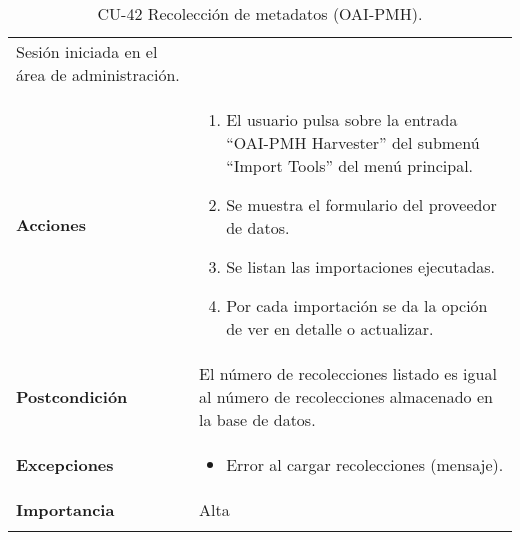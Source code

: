 \begin{longtable}[]{@{}ll@{}}
\begin{minipage}[t]{0.75\columnwidth}
Sesión iniciada en el área de administración.\strut
\end{minipage}\tabularnewline
\begin{minipage}[t]{0.19\columnwidth}\raggedright
\textbf{Acciones}\strut
\end{minipage} & \begin{minipage}[t]{0.75\columnwidth}\raggedright
\begin{enumerate}
\def\labelenumi{\arabic{enumi}.}
\tightlist
\item
  El usuario pulsa sobre la entrada ``OAI-PMH Harvester'' del submenú
  ``Import Tools'' del menú principal.
\item
  Se muestra el formulario del proveedor de datos.
\item
  Se listan las importaciones ejecutadas.
\item
  Por cada importación se da la opción de ver en detalle o actualizar.
\end{enumerate}\strut
\end{minipage}\tabularnewline
\begin{minipage}[t]{0.19\columnwidth}\raggedright
\textbf{Postcondición}\strut
\end{minipage} & \begin{minipage}[t]{0.75\columnwidth}\raggedright
El número de recolecciones listado es igual al número de recolecciones
almacenado en la base de datos.\strut
\end{minipage}\tabularnewline
\begin{minipage}[t]{0.19\columnwidth}\raggedright
\textbf{Excepciones}\strut
\end{minipage} & \begin{minipage}[t]{0.75\columnwidth}\raggedright
\begin{itemize}
\tightlist
\item
  Error al cargar recolecciones (mensaje).
\end{itemize}\strut
\end{minipage}\tabularnewline
\begin{minipage}[t]{0.19\columnwidth}\raggedright
\textbf{Importancia}\strut
\end{minipage} & \begin{minipage}[t]{0.75\columnwidth}\raggedright
Alta\strut
\end{minipage}\tabularnewline
\bottomrule
\caption{CU-42 Recolección de metadatos (OAI-PMH).}
\end{longtable}

